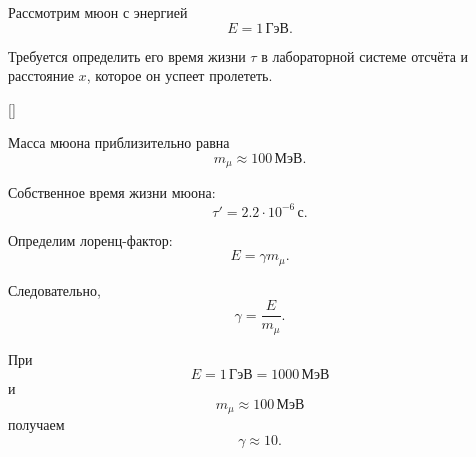 \documentclass[../final.tex]{subfiles}
\begin{document}
\newpage
{}

\condition

Рассмотрим мюон с энергией
%
\begin{equation*}
    E
    =
    1\,\text{ГэВ}.
\end{equation*}

Требуется определить его время жизни $\tau$ в лабораторной системе
отсчёта и расстояние $x$, которое он успеет пролететь.

\begin{rbox}[left=18pt,right=18pt,top=14pt,bottom=10pt]{[]}
    \centering


    \captionsetup{
        font=footnotesize,
        labelfont=bf,
        skip=5pt
    }

    \label{fig:practice02_muon}
\end{rbox}

Масса мюона приблизительно равна
%
\begin{equation*}
    m_\mu
    \approx
    100\,\text{МэВ}.
\end{equation*}

Собственное время жизни мюона:
%
\begin{equation*}
    \tau'
    =
    2.2\cdot10^{-6}\,\text{с}.
\end{equation*}

Определим лоренц-фактор:
%
\begin{equation*}
    E
    =
    \gamma m_\mu.
\end{equation*}

Следовательно,
%
\begin{equation*}
    \gamma
    =
    \frac{E}{m_\mu}.
\end{equation*}

При
%
\begin{equation*}
    E
    =
    1\,\text{ГэВ}
    =
    1000\,\text{МэВ}
\end{equation*}
%
и
%
\begin{equation*}
    m_\mu
    \approx
    100\,\text{МэВ}
\end{equation*}
%
получаем
%
\begin{equation*}
    \gamma
    \approx
    10.
\end{equation*}
\end{document}
